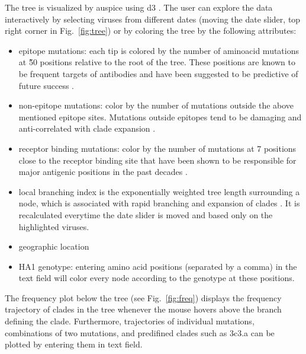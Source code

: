 \documentclass{bioinfo}
\newcommand{\FIG}[1]{Fig.~\ref{fig:#1}}
\begin{document}
The tree is visualized by auspice using d3 \citep{bostock_d3_2011}.
The user can explore the data interactively by selecting viruses from different dates (moving the date slider, top right corner in \FIG{tree}) or by coloring the tree by the following attributes:
\begin{itemize}
	\item epitope mutations: each tip is colored by the number of aminoacid mutations at \~50 positions relative to the root of the tree.
These positions are known to be frequent targets of antibodies \citep{shih_simultaneous_2007} and have been suggested to be predictive of future success \citep{luksza_predictive_2014}.
	\item non-epitope mutations: color by the number of mutations outside the above mentioned epitope sites.
	Mutations outside epitopes tend to be damaging and anti-correlated with clade expansion \citep{luksza_predictive_2014}.
    \item receptor binding mutations: color by the number of mutations at 7 positions close to the receptor binding site that have been shown to be responsible for major antigenic positions in the past decades \citep{koel_substitutions_2013}.
    \item local branching index is the exponentially weighted tree length surrounding a node, which is associated with rapid branching and expansion of clades \citep{neher_predicting_2014}.
It is recalculated everytime the date slider is moved and based only on the highlighted viruses.
    \item geographic location
    \item HA1 genotype: entering amino acid positions (separated by a comma) in the text field will color every node according to the genotype at these positions.
\end{itemize}

The frequency plot below the tree (see \FIG{freq}) displays the frequency trajectory of clades in the tree whenever the mouse hovers above the branch defining the clade. 
Furthermore, trajectories of individual mutations, combinations of two mutations, and predifined clades such as 3c3.a can be plotted by entering them in text field.
\end{document}
